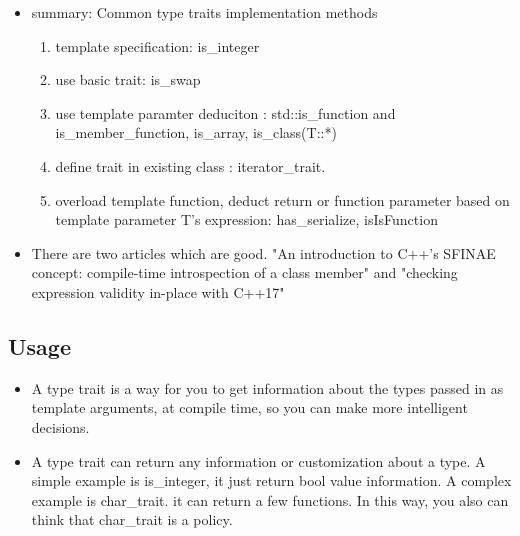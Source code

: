 \documentclass[a4paper,11pt,twoside]{book}
\begin{document}
\begin{itemize}
	\item summary: Common type traits implementation methods
	\begin{enumerate}
		\item template specification: is\_integer
		\item use basic trait: is\_swap
		\item use template paramter deduciton : std::is\_function and
		is\_member\_function, is\_array, is\_class(T::*)
		\item define trait in existing class : iterator\_trait.
		\item overload template function, deduct return or function parameter based on template parameter T's expression:  has\_serialize, isIsFunction
	\end{enumerate}

	\item There are two articles which are good.
"An introduction to C++'s SFINAE concept: compile-time introspection of a class member" and "checking expression validity in-place with C++17"
\end{itemize}


\subsection{Usage}
\begin{itemize}
	\item A type trait is a way for you to get information about the types passed in as template arguments, at compile time, so you can make more intelligent decisions. 
	
	\item A type trait can return any information or customization about a type. A simple example is is\_integer, it just return bool value information. A complex example is char\_trait. it can return a few functions. In this way, you also can think that char\_trait is a policy. 
	
\end{itemize}
\end{document}

